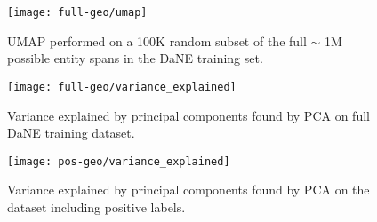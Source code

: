 \documentclass[main.tex]{subfiles}
\begin{document}
\begin{figure}[H]
    \centering
        \texttt{[image: full-geo/umap]}
    \caption{
        UMAP performed on a 100K random subset of the full $\sim$ 1M possible entity spans in the DaNE training set.
    }
    \label{fig:full-umap}
\end{figure}\noindent

\begin{figure}[H]
    \centering
        \texttt{[image: full-geo/variance\_explained]}
    \caption{
        Variance explained by principal components found by PCA on full DaNE training dataset.
    }
    \label{fig:full-varex}
\end{figure}\noindent

\begin{figure}[H]
    \centering
        \texttt{[image: pos-geo/variance\_explained]}
    \caption{
        Variance explained by principal components found by PCA on the dataset including positive labels.
    }
    \label{fig:pos-varex}
\end{figure}\noindent
\end{document}

